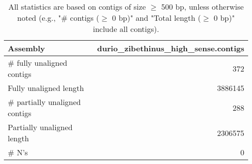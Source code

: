 \documentclass[12pt,a4paper]{article}
\begin{document}
\begin{table}[ht]
\begin{center}
\caption{All statistics are based on contigs of size $\geq$ 500 bp, unless otherwise noted (e.g., "\# contigs ($\geq$ 0 bp)" and "Total length ($\geq$ 0 bp)" include all contigs).}
\begin{tabular}{|l*{1}{|r}|}
\hline
Assembly & durio\_zibethinus\_high\_sense.contigs \\ \hline
\# fully unaligned contigs & 372 \\ \hline
Fully unaligned length & 3886145 \\ \hline
\# partially unaligned contigs & 288 \\ \hline
Partially unaligned length & 2306575 \\ \hline
\# N's & 0 \\ \hline
\end{tabular}
\end{center}
\end{table}
\end{document}
